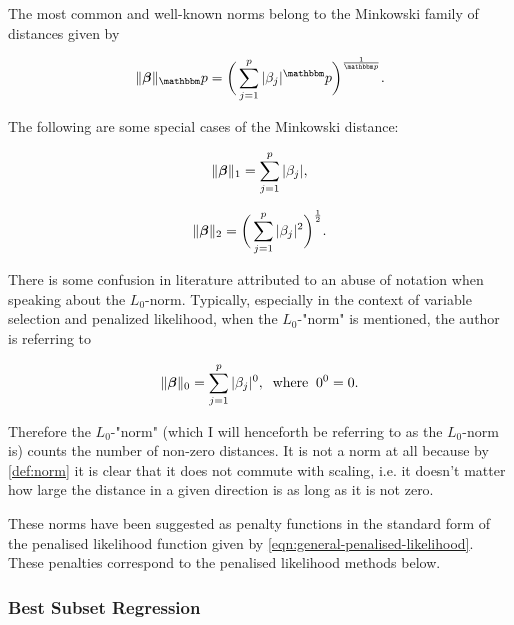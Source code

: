 The most common and well-known norms belong to the Minkowski family of distances given by

\begin{equation}
    \Vert\Beta\Vert_\p = \bigg(\sum_{j=1}^p|\beta_j|^\p\bigg)^{\frac{1}{\p}}.
\end{equation}

The following are some special cases of the Minkowski distance:

\begin{definition}\label{def:manhattan-distance}
\begin{equation}\label{eqn:manhattan-distance}
    \Vert\boldsymbol{\beta}\Vert_1 = \sum_{j=1}^p|\beta_j|,
\end{equation}
\end{definition}

\begin{definition}\label{def:euclidean-distance}
\begin{equation}\label{eqn:euclidean-distance}
    \Vert\boldsymbol{\beta}\Vert_2 = \bigg(\sum_{j=1}^p|\beta_j|^2\bigg)^{\frac{1}{2}}.
\end{equation}
\end{definition}

There is some confusion in literature attributed to an abuse of notation when speaking about the $L_0$-norm. Typically, especially in the context of variable selection and penalized likelihood, when the $L_0$-"norm" is mentioned, the author is referring to

\begin{equation}
    \Vert\boldsymbol{\beta}\Vert_0 =\sum_{j=1}^p|\beta_j|^0,\;\;\textrm{where}\;\;0^0=0.
\end{equation}

Therefore the $L_0$-"norm" (which I will henceforth be referring to as the $L_0$-norm is) counts the number of non-zero distances. It is not a norm at all because by \cref{def:norm} it is clear that it does not commute with scaling, i.e. it doesn't matter how large the distance in a given direction is as long as it is not zero.

These norms have been suggested as penalty functions in the standard form of the penalised likelihood function given by \cref{eqn:general-penalised-likelihood}. These penalties correspond to the penalised likelihood methods below.

\subsubsection{Best Subset Regression}

